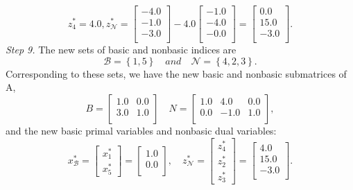 \documentclass [12pt] {article}
\begin{document}
\[
z^*_4 = 4.0,        z^*_{\mathcal N} = 
\begin{bmatrix} -4.0 \\ -1.0 \\ -3.0 \\ \end{bmatrix} - 4.0 \begin{bmatrix} -1.0 \\ -4.0 \\ -0.0 \\ \end{bmatrix} = \begin{bmatrix} 0.0 \\ 15.0 \\ -3.0 \\ \end{bmatrix} .
\]
\textit{Step 9.} The new sets of basic and nonbasic indices are
\[
{\mathcal B} = \left \{ 1, 5 \right \}  \quad
and    \quad
{\mathcal N} = \left \{ 4, 2, 3 \right \}.
\]
Corresponding to these sets, we have the new basic and nonbasic submatrices of A,
\[
B = \begin{bmatrix} 1.0 & 0.0 \\ 3.0 & 1.0 \\ \end{bmatrix}  \quad
N = \begin{bmatrix} 1.0 & 4.0 & 0.0 \\ 0.0 & -1.0 & 1.0 \\ \end{bmatrix},
\]
and the new basic primal variables and nonbasic dual variables:
\[
 x^*_{\mathcal B} = 
\begin{bmatrix} x^*_1 \\ x^*_5 \end{bmatrix} = \begin{bmatrix} 1.0 \\ 0.0 \\ \end{bmatrix} ,   \quad
z^*_{\mathcal N} = 
\begin{bmatrix} z^*_4 \\ z^*_2 \\ z^*_3 \end{bmatrix} = \begin{bmatrix} 4.0 \\ 15.0 \\ -3.0 \\ \end{bmatrix}.
\]
\end{document}
